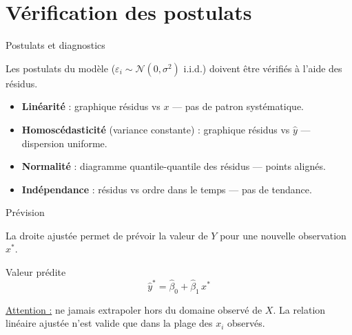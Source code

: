 \documentclass{BeamerTemplate}
\begin{document}
\section{Vérification des postulats}

\begin{frame}[t]{Postulats et diagnostics}

Les postulats du modèle ($\varepsilon_i \sim \mathcal{N}(0, \sigma^2)$ i.i.d.) doivent être vérifiés à l'aide des résidus.

\bigskip
\begin{itemize}\itemsep5mm
  \item \textbf{Linéarité} : graphique résidus vs $x$ — pas de patron systématique.
  \item \textbf{Homoscédasticité} (variance constante) : graphique résidus vs $\hat{y}$ — dispersion uniforme.
  \item \textbf{Normalité} : diagramme quantile-quantile des résidus — points alignés.
  \item \textbf{Indépendance} : résidus vs ordre dans le temps — pas de tendance.
\end{itemize}

\end{frame}

\begin{frame}[t]{Prévision}

La droite ajustée permet de \alert{prévoir} la valeur de $Y$ pour une nouvelle observation $x^*$.

\bigskip
\begin{Boite}{Valeur prédite}
$$\hat{y}^* = \hat{\beta}_0 + \hat{\beta}_1\, x^*$$
\end{Boite}

\medskip
\underline{Attention :} ne jamais extrapoler hors du domaine observé de $X$. La relation linéaire ajustée n'est valide que dans la plage des $x_i$ observés.

\end{frame}
\end{document}
